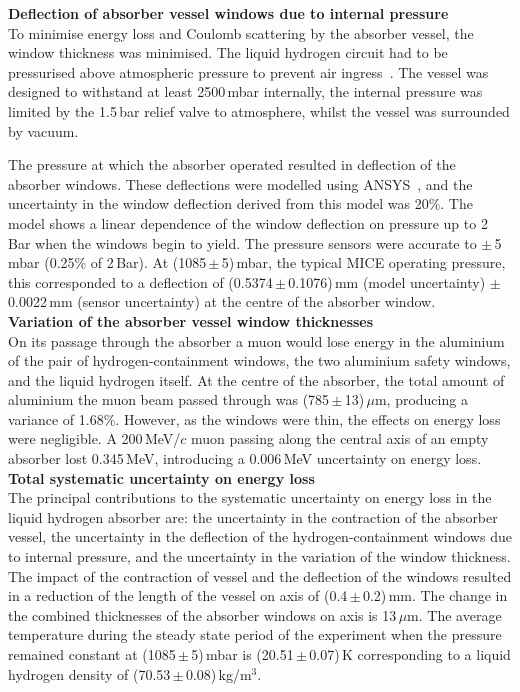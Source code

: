 \noindent\textbf{Deflection of absorber vessel windows due to internal
  pressure} \\
\noindent
To minimise energy loss and Coulomb scattering by the absorber vessel,
the window thickness was minimised.
The liquid hydrogen circuit had to be pressurised
above atmospheric pressure to prevent air ingress~\cite{1748-0221-13-09-T09008,Ishimoto}. 
The vessel was designed to withstand at least 2500\,mbar internally, the internal pressure was limited by the 1.5\,bar relief valve to atmosphere, whilst the vessel was surrounded by vacuum.

The pressure at which the absorber operated resulted in deflection of the absorber windows. These
deflections were modelled using ANSYS~\cite{NOTE155}, and the uncertainty in the
window deflection derived from this model was 20\%.
The model shows a linear dependence of the window deflection on
pressure up to 2\,Bar when the windows begin to yield.
The pressure sensors were accurate to $\mathrm{\pm}$\,5\,mbar
(0.25\% of 2\,Bar).
At (1085\,$\mathrm{\pm}$\,5)\,mbar, the typical MICE operating
pressure, this corresponded to a deflection of
(0.5374\,$\mathrm{\pm}$\,0.1076)\,mm (model uncertainty)
$\mathrm{\pm}$\,0.0022\,mm (sensor uncertainty) at the centre of the
absorber window. \\

\noindent\textbf{Variation of the absorber vessel window thicknesses} \\
\noindent
On its passage through the absorber a muon would lose energy in the
aluminium of the pair of hydrogen-containment windows, the two
aluminium safety windows, and the liquid hydrogen itself.
At the centre of the absorber, the total amount of aluminium the muon
beam passed through was (785\,$\mathrm{\pm}$\,13)\,$\mu$m, producing a variance
of 1.68\%.
However, as the windows were thin, the effects on energy loss were
negligible.
A 200\,MeV/$c$ muon passing along the central axis of an empty
absorber lost 0.345\,MeV, introducing a 0.006\,MeV uncertainty
on energy loss.  \\

\noindent\textbf{Total systematic uncertainty on energy loss} \\
\noindent
The principal contributions to the systematic uncertainty on energy
loss in the liquid hydrogen absorber are: the uncertainty in the
contraction of the absorber vessel, the uncertainty in the deflection
of the hydrogen-containment windows due to internal pressure, and the
uncertainty in the variation of the window thickness.
The impact of the contraction of vessel and the deflection of the
windows resulted in a reduction of the length of the vessel on
axis of (0.4\,$\mathrm{\pm}$\,0.2)\,mm.
The change in the combined thicknesses of the absorber
windows on axis is 13\,$\mu$m.
The average temperature during the steady state period of the
experiment when the pressure remained constant at
(1085\,$\mathrm{\pm}$\,5)\,mbar is (20.51\,$\mathrm{\pm}$\,0.07)\,K 
corresponding to a liquid hydrogen density of (70.53\,$\mathrm{\pm}$\,0.08)\,kg/m$^{3}$.

